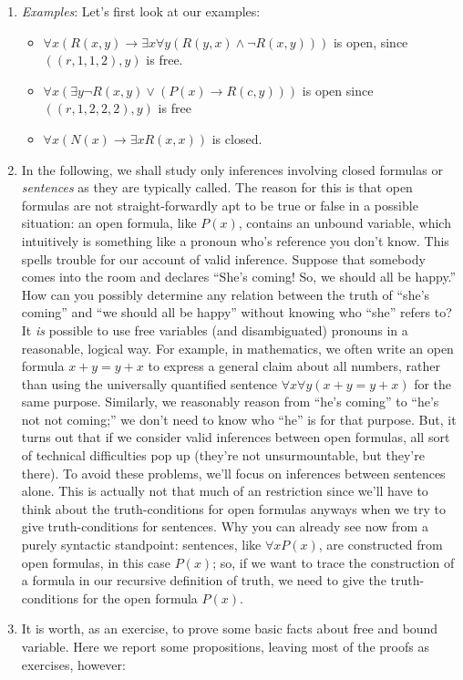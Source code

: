 \begin{enumerate}[\thesection.1]
		\item \emph{Examples}: Let's first look at our examples:
		
		
			\begin{itemize}
			
				\item $\forall x(R(x,y)\to \exists x\forall y(R(y,x)\land \neg R(x,y)))$ is open, since $((r,1,1,2),y)$ is free.

			
				\item $\forall x(\exists y \neg R(x,y)\lor (P(x)\to R(c,y)))$ is open since $( ( r,1,2,2,2), y)$ is free
				
				\item $\forall x({N}(x)\to {\exists x}R(x,x))$ is closed.
			
			\end{itemize}

	  \item In the following, we shall study only inferences involving closed formulas or \emph{sentences} as they are typically called.
		The reason for this is that open formulas are not straight-forwardly apt to be true or false in a possible situation: an open formula, like $P(x)$, contains an unbound variable, which intuitively is something like a pronoun who's reference you don't know.
		This spells trouble for our account of valid inference.
		Suppose that somebody comes into the room and declares ``She's coming! So, we should all be happy.''
		How can you possibly determine any relation between the truth of ``she's coming'' and ``we should all be happy'' without knowing who ``she'' refers to?
		It \emph{is} possible to use free variables (and disambiguated) pronouns in a reasonable, logical way.
		For example, in mathematics, we often write an open formula
		$x+y=y+x$
		to express a general claim about all numbers, rather than using the universally quantified sentence
		$\forall x\forall y(x+y=y+x)$
		for the same purpose.
		Similarly, we reasonably reason from ``he's coming'' to ``he's not not coming;'' we don't need to know who ``he'' is for that purpose.
		But, it turns out that if we consider valid inferences between open formulas, all sort of technical difficulties pop up (they're not unsurmountable, but they're there).
		To avoid these problems, we'll focus on inferences between sentences alone.
		This is actually not that much of an restriction since we'll have to think about the truth-conditions for open formulas anyways when we try to give truth-conditions for sentences.
		Why you can already see now from a purely syntactic standpoint:
		sentences, like
		$\forall xP(x)$,
		are constructed from open formulas,
		in this case $P(x)$;
		so, if we want to trace the construction of a formula in our recursive definition of truth, we need to give the truth-conditions for the open formula
$P(x)$.
		\item It is worth, as an exercise, to prove some basic facts about free and bound variable. Here we report some propositions, leaving most of the proofs as exercises, however:
		

\end{enumerate}
